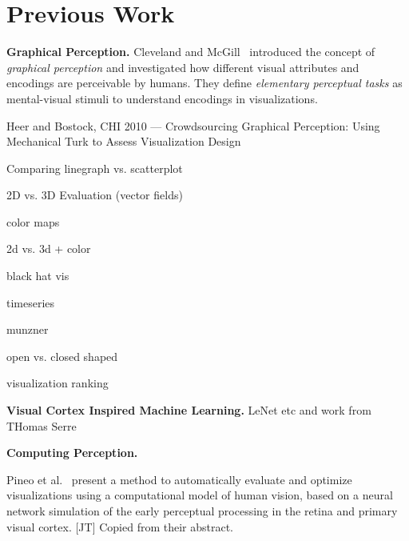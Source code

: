 \section{Previous Work}

\textbf{Graphical Perception.} Cleveland and McGill~\cite{cleveland_mcgill} introduced the concept of \emph{graphical perception} and investigated how different visual attributes and encodings are perceivable by humans. They define \emph{elementary perceptual tasks} as mental-visual stimuli to understand encodings in visualizations. 



\cite{HeerBostock2010} Heer and Bostock, CHI 2010 --- Crowdsourcing Graphical Perception: Using Mechanical Turk to Assess Visualization Design


\cite{Wang_linegraph_vs_scatterplot} Comparing linegraph vs. scatterplot


\cite{mckenzie_2d_3d} \cite{forsberg2009comparing_3d_vector} \cite{laidlaw_2d_vector} 2D vs. 3D Evaluation (vector fields)


\cite{kindlmann2002color} \cite{rheingans1992color} \cite{ware1988color} \cite{Rogowitz2001_colormaps} color maps

2d vs. 3d + color \cite{borkin2011arteries}

black hat vis \cite{heer2017blackhat}

timeseries \cite{herr2009timeseries}

munzner \cite{munzner2015visualization}

open vs. closed shaped \cite{open_vs_closed_shapes}

visualization ranking \cite{harrison2014_webers_law_rank}

\textbf{Visual Cortex Inspired Machine Learning.} LeNet etc and work from THomas Serre



\textbf{Computing Perception.}

Pineo et al.~\cite{Pineo2012_computational_perception} present a method to automatically evaluate and optimize visualizations using a computational model of human vision, based on a neural network simulation of the early perceptual processing in the retina and primary visual cortex. [JT] Copied from their abstract.

